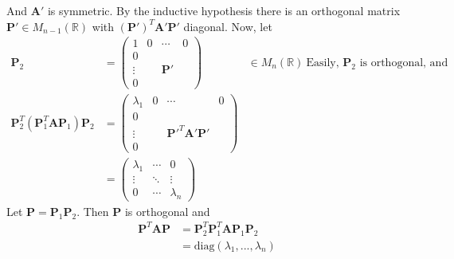 \documentclass{report}
\theoremstyle{remark}
\theoremstyle{definition}
\theoremstyle{definition}
\theoremstyle{theorem}
\renewcommand{\v}[1]{\mathbf{#1}}
\begin{document}
And $\v{A}'$ is symmetric. By the inductive hypothesis there is an orthogonal matrix $\v{P}' \in M_{n-1}(\mathbb{R})$ with $(\v{P}')^T\v{A}'\v{P}'$ diagonal. Now, let
\begin{align*}
    \v{P}_2&=\begin{pmatrix}
    1&0&\cdots&0\\
    0&&&\\
    \vdots&&\v{P}'&\\
    0&&&
    \end{pmatrix}
    &\in M_n(\mathbb{R}) \> \text{Easily, $\v{P}_2$ is orthogonal, and}\\
    \v{P}_2^T(\v{P}_1^T\v{AP}_1)\v{P}_2&=\begin{pmatrix}
    \lambda_1&0&\cdots&0\\
    0&&&\\
    \vdots&&\v{P}'^T\v{A}'\v{P}'&\\
    0&&&
    \end{pmatrix}\\
    &=\begin{pmatrix}
    \lambda_1&\cdots&0\\
    \vdots&\ddots&\vdots\\
    0&\cdots&\lambda_n
    \end{pmatrix}
\end{align*}
Let $\v{P}=\v{P}_1\v{P}_2$. Then $\v{P}$ is orthogonal and
\begin{align}
    \v{P}^T\v{AP}&=\v{P}_2^T\v{P}_1^T\v{AP}_1\v{P}_2\\
    &= \mathrm{diag}(\lambda_1,...,\lambda_n)
\end{align}
\setcounter{subsubsection}{3}
\end{document}
